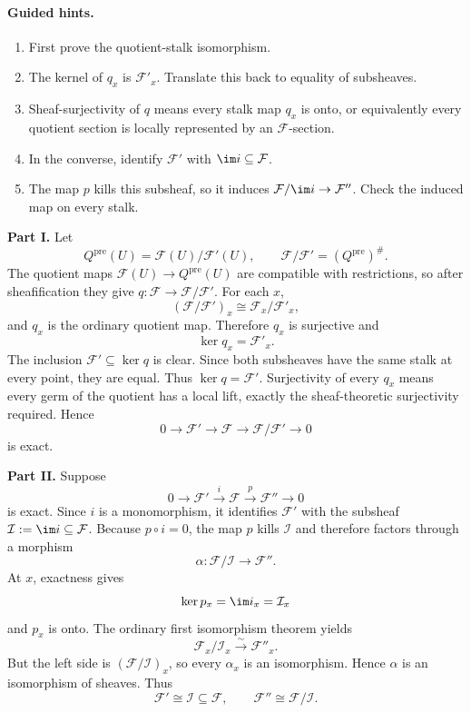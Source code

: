 \paragraph{Guided hints.}
\begin{enumerate}
\item First prove the quotient-stalk isomorphism.
\item The kernel of $q_x$ is $\mathcal F'_x$.  Translate this back to equality of subsheaves.
\item Sheaf-surjectivity of $q$ means every stalk map $q_x$ is onto, or equivalently every
quotient section is locally represented by an $\mathcal F$-section.
\item In the converse, identify $\mathcal F'$ with $\im i\subseteq\mathcal F$.
\item The map $p$ kills this subsheaf, so it induces
$\mathcal F/\im i\to\mathcal F''$.  Check the induced map on every stalk.
\end{enumerate}

\begin{solution}
\textbf{Part I.}
Let
\[
Q^{\mathrm{pre}}(U)=\mathcal F(U)/\mathcal F'(U),
\qquad
\mathcal F/\mathcal F'=(Q^{\mathrm{pre}})^\#.
\]
The quotient maps $\mathcal F(U)\to Q^{\mathrm{pre}}(U)$ are compatible with restrictions,
so after sheafification they give $q:\mathcal F\to\mathcal F/\mathcal F'$.
For each $x$,
\[
(\mathcal F/\mathcal F')_x\cong\mathcal F_x/\mathcal F'_x,
\]
and $q_x$ is the ordinary quotient map.  Therefore $q_x$ is surjective and
\[
\ker q_x=\mathcal F'_x.
\]
The inclusion $\mathcal F'\subseteq\ker q$ is clear.  Since both subsheaves have the same
stalk at every point, they are equal.  Thus $\ker q=\mathcal F'$.  Surjectivity of every
$q_x$ means every germ of the quotient has a local lift, exactly the sheaf-theoretic
surjectivity required.  Hence
\[
0\to\mathcal F'\to\mathcal F\to\mathcal F/\mathcal F'\to0
\]
is exact.

\textbf{Part II.}
Suppose
\[
0\to\mathcal F'\xrightarrow{i}\mathcal F\xrightarrow{p}\mathcal F''\to0
\]
is exact.  Since $i$ is a monomorphism, it identifies $\mathcal F'$ with the subsheaf
$\mathcal I:=\im i\subseteq\mathcal F$.  Because $p\circ i=0$, the map $p$ kills
$\mathcal I$ and therefore factors through a morphism
\[
\alpha:\mathcal F/\mathcal I\longrightarrow\mathcal F''.
\]
At $x$, exactness gives
\[
\ker p_x=\im i_x=\mathcal I_x
\]
and $p_x$ is onto.  The ordinary first isomorphism theorem yields
\[
\mathcal F_x/\mathcal I_x\xrightarrow{\sim}\mathcal F''_x.
\]
But the left side is $(\mathcal F/\mathcal I)_x$, so every $\alpha_x$ is an isomorphism.
Hence $\alpha$ is an isomorphism of sheaves.  Thus
\[
\mathcal F'\cong\mathcal I\subseteq\mathcal F,
\qquad
\mathcal F''\cong\mathcal F/\mathcal I.
\]
\end{solution}

